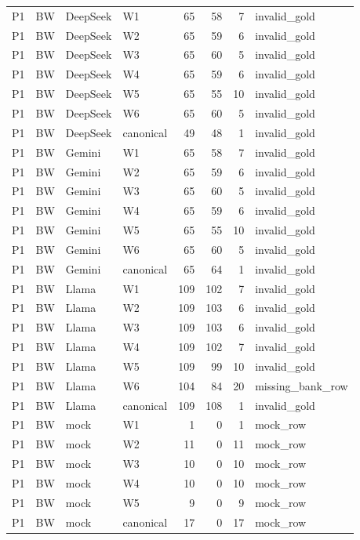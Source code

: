 \begin{table}[t]
\begin{tabular}{llllrrrl}
    P1 & BW & DeepSeek & W1 & 65 & 58 & 7 & invalid\_gold \\
    P1 & BW & DeepSeek & W2 & 65 & 59 & 6 & invalid\_gold \\
    P1 & BW & DeepSeek & W3 & 65 & 60 & 5 & invalid\_gold \\
    P1 & BW & DeepSeek & W4 & 65 & 59 & 6 & invalid\_gold \\
    P1 & BW & DeepSeek & W5 & 65 & 55 & 10 & invalid\_gold \\
    P1 & BW & DeepSeek & W6 & 65 & 60 & 5 & invalid\_gold \\
    P1 & BW & DeepSeek & canonical & 49 & 48 & 1 & invalid\_gold \\
    P1 & BW & Gemini & W1 & 65 & 58 & 7 & invalid\_gold \\
    P1 & BW & Gemini & W2 & 65 & 59 & 6 & invalid\_gold \\
    P1 & BW & Gemini & W3 & 65 & 60 & 5 & invalid\_gold \\
    P1 & BW & Gemini & W4 & 65 & 59 & 6 & invalid\_gold \\
    P1 & BW & Gemini & W5 & 65 & 55 & 10 & invalid\_gold \\
    P1 & BW & Gemini & W6 & 65 & 60 & 5 & invalid\_gold \\
    P1 & BW & Gemini & canonical & 65 & 64 & 1 & invalid\_gold \\
    P1 & BW & Llama & W1 & 109 & 102 & 7 & invalid\_gold \\
    P1 & BW & Llama & W2 & 109 & 103 & 6 & invalid\_gold \\
    P1 & BW & Llama & W3 & 109 & 103 & 6 & invalid\_gold \\
    P1 & BW & Llama & W4 & 109 & 102 & 7 & invalid\_gold \\
    P1 & BW & Llama & W5 & 109 & 99 & 10 & invalid\_gold \\
    P1 & BW & Llama & W6 & 104 & 84 & 20 & missing\_bank\_row \\
    P1 & BW & Llama & canonical & 109 & 108 & 1 & invalid\_gold \\
    P1 & BW & mock & W1 & 1 & 0 & 1 & mock\_row \\
    P1 & BW & mock & W2 & 11 & 0 & 11 & mock\_row \\
    P1 & BW & mock & W3 & 10 & 0 & 10 & mock\_row \\
    P1 & BW & mock & W4 & 10 & 0 & 10 & mock\_row \\
    P1 & BW & mock & W5 & 9 & 0 & 9 & mock\_row \\
    P1 & BW & mock & canonical & 17 & 0 & 17 & mock\_row \\

\end{tabular}
\end{table}
